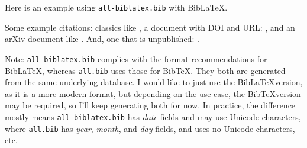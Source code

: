 \documentclass{article}
\begin{document}

Here is an example using \texttt{all-biblatex.bib} with Bib\LaTeX{}.

Some example citations: classics like \textcite{chomsky.n:1957, kolmogorov.a:1968,
tesniere.l:1959, estes.w:1959}, a document with DOI and URL: \textcite{earley.j:1970},
and an arXiv document like \textcite{tay.y:2022}. And, one that is unpublished: \textcite{narayanan.s:2004}.

Note: \texttt{all-biblatex.bib} complies with
the format recommendations for Bib\LaTeX, whereas \texttt{all.bib} uses those for Bib\TeX. 
They both are generated from the same underlying database.
I would like to just use the Bib\LaTeX version, as it is a more modern format, but depending on the use-case, the Bib\TeX version may be required, so I'll keep generating both for now. In practice, the difference mostly means \texttt{all-biblatex.bib} has \emph{date} fields and may use Unicode characters, where \texttt{all.bib} has \emph{year}, \emph{month}, and \emph{day} fields, and uses no Unicode characters, etc.

\printbibliography
\end{document}
